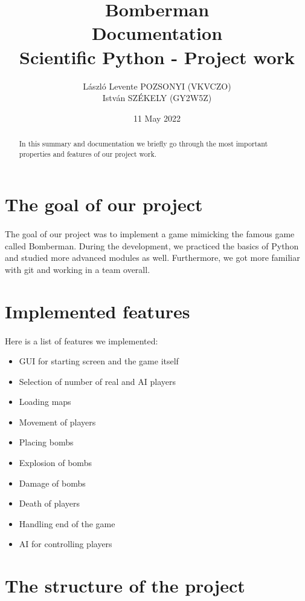 \documentclass{article}
\title{\textbf{Bomberman}\\ Documentation\\ Scientific Python - Project work}
\author{László Levente POZSONYI (VKVCZO) \\ István SZÉKELY (GY2W5Z)}
\date{11 May 2022}
\begin{document}
\maketitle

\begin{abstract}
In this summary and documentation we briefly go through the most important properties and features of our project work.
\end{abstract}

\section{The goal of our project}
    \paragraph{}
    The goal of our project was to implement a game mimicking the famous game called Bomberman. During the development, we practiced the basics of Python and studied more advanced modules as well. Furthermore, we got more familiar with git and working in a team overall.

\section{Implemented features}
    \paragraph{}
    Here is a list of features we implemented:
    \begin{itemize}
        \item GUI for starting screen and the game itself
        \item Selection of number of real and AI players
        \item Loading maps
        \item Movement of players
        \item Placing bombs
        \item Explosion of bombs
        \item Damage of bombs
        \item Death of players
        \item Handling end of the game
        \item AI for controlling players
    \end{itemize}

\section{The structure of the project}
\end{document}
